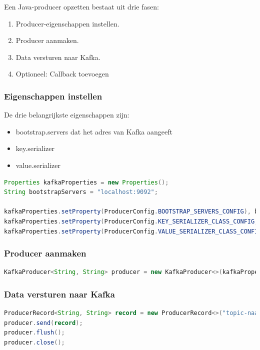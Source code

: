 \documentclass[a4paper,10pt,twoside]{report}
\begin{document}
Een Java-producer opzetten bestaat uit drie fasen:

\begin{enumerate}
	\item Producer-eigenschappen instellen.
	\item Producer aanmaken.
	\item Data versturen naar Kafka.
	\item Optioneel: Callback toevoegen
\end{enumerate}

\subsubsection{Eigenschappen instellen}

De drie belangrijkste eigenschappen zijn: 

\begin{itemize}
	\item bootstrap.servers dat het adres van Kafka aangeeft
	\item key.serializer
	\item value.serializer
\end{itemize}

\begin{lstlisting}[language=Java]
Properties kafkaProperties = new Properties();
String bootstrapServers = "localhost:9092";

kafkaProperties.setProperty(ProducerConfig.BOOTSTRAP_SERVERS_CONFIG), bootstrapServers);
kafkaProperties.setProperty(ProducerConfig.KEY_SERIALIZER_CLASS_CONFIG, bootstrapServers);
kafkaProperties.setProperty(ProducerConfig.VALUE_SERIALIZER_CLASS_CONFIG, StringSerializer.class.getName());
\end{lstlisting}

\subsubsection{Producer aanmaken}

\begin{lstlisting}[language=Java]
KafkaProducer<String, String> producer = new KafkaProducer<>(kafkaProperties);
\end{lstlisting}

\subsubsection{Data versturen naar Kafka}

\begin{lstlisting}[language=Java]
ProducerRecord<String, String> record = new ProducerRecord<>("topic-naam", "message-inhoud-message");
producer.send(record);
producer.flush();
producer.close();
\end{lstlisting}
\end{document}
